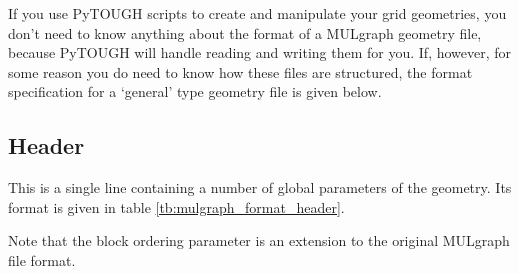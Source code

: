 If you use PyTOUGH scripts to create and manipulate your grid geometries, you don't need to know anything about the format of a MULgraph geometry file, because PyTOUGH will handle reading and writing them for you. If, however, for some reason you do need to know how these files are structured, the format specification for a `general' type geometry file is given below.

\subsection{Header}

This is a single line containing a number of global parameters of the geometry. Its format is given in table \ref{tb:mulgraph_format_header}.

Note that the block ordering parameter is an extension to the original MULgraph file format.

